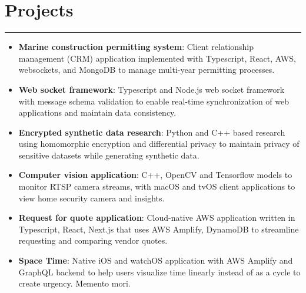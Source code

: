 \documentclass[letterpaper,11pt]{article}
\begin{document}
\section*{Projects}
\hrule
\begin{itemize}[leftmargin=*,nosep]
  \item \textbf{Marine construction permitting system}: Client relationship management (CRM) application implemented with Typescript, React, AWS, websockets, and MongoDB to manage multi-year permitting processes.
  \item \textbf{Web socket framework}: Typescript and Node.js web socket framework with message schema validation to enable real-time synchronization of web applications and maintain data consistency.
  \item \textbf{Encrypted synthetic data research}: Python and C++ based research using homomorphic encryption and differential privacy to maintain privacy of sensitive datasets while generating synthetic data.
  \item \textbf{Computer vision application}: C++, OpenCV and Tensorflow models to monitor RTSP camera streams, with macOS and tvOS client applications to view home security camera and insights.
  \item \textbf{Request for quote application}: Cloud-native AWS application written in Typescript, React, Next.js that uses AWS Amplify, DynamoDB to streamline requesting and comparing vendor quotes.
  \item \textbf{Space Time}: Native iOS and watchOS application with AWS Amplify and GraphQL backend to help users visualize time linearly instead of as a cycle to create urgency. Memento mori.
\end{itemize}

\vspace{-10px}
\end{document}
